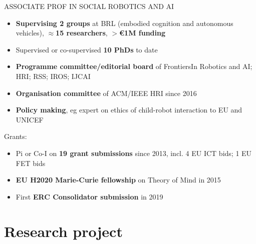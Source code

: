 \documentclass[xcolor=table]{beamer}
\makeatletter
\let\beamer@writeslidentry@miniframeson=\beamer@writeslidentry
\newcommand*{\miniframeson}{\let\beamer@writeslidentry=\beamer@writeslidentry@miniframeson}
\makeatother
\begin{document}
\begin{frame}{ASSOCIATE PROF IN SOCIAL ROBOTICS AND AI}
    \begin{itemize}
        \item \textbf{Supervising 2 groups} at BRL (embodied cognition and autonomous
            vehicles), $\approx$\textbf{15 researchers}, \textbf{$>$€1M funding}
        \item Supervised or co-supervised \textbf{10 PhDs} to date
        \item \textbf{Programme committee/editorial board} of FrontiersIn Robotics and
            AI; HRI; RSS; IROS; IJCAI
        \item \textbf{Organisation committee} of ACM/IEEE HRI since 2016
        \item \textbf{Policy making}, eg expert on ethics of child-robot interaction to EU and UNICEF
    \end{itemize}

    Grants:
    \begin{itemize}
        \item Pi or Co-I on \textbf{19 grant submissions} since 2013, incl. 4 EU ICT bids; 1
            EU FET bids
        \item \textbf{EU H2020 Marie-Curie fellowship} on Theory of Mind in 2015
        \item First \textbf{ERC Consolidator submission} in 2019
    \end{itemize}

\end{frame}






\miniframeson{}

\section{Research project}
\end{document}

